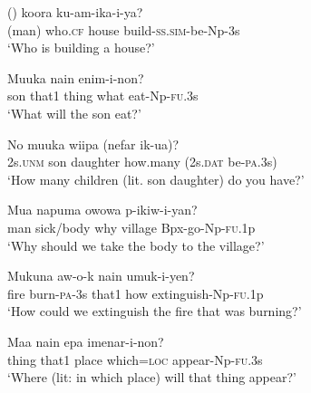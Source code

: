 \ea%
\label{ex:7:x1167}
\gll ()    koora  ku-am-ika-i-ya? \\
  (man)  who.\textsc{cf}  house  build-\textsc{ss}.\textsc{sim}-be-Np-3s    \\
\glt `Who is building a house?'
\z





\ea%
\label{ex:7:x1166}
\gll Muuka  nain      enim-i-non? \\
son  that1  thing  what  eat-Np-\textsc{fu}.3s  \\
\glt `What will the son eat?'
\z





\ea%
\label{ex:7:x1164}
\gll No  muuka  wiipa    (nefar  ik-ua)? \\
2s.\textsc{unm}  son  daughter  how.many  (2s.\textsc{dat}  be-\textsc{pa}.3s)\\
\glt `How many children (lit. son daughter) do you have?'
\z





\ea%
\label{ex:7:x1165}
\gll Mua  napuma    owowa  p-ikiw-i-yan? \\
man  sick/body  why  village  Bpx-go-Np-\textsc{fu}.1p  \\
\glt `Why should we take the body to the village?'
\z





\ea%
\label{ex:7:x1378}
\gll Mukuna  aw-o-k  nain    umuk-i-yen? \\
fire  burn-\textsc{pa}-3s  that1  how  extinguish-Np-\textsc{fu}.1p      \\
\glt `How could we extinguish the fire that was burning?'
\z





\ea%
\label{ex:7:x1173}
\gll Maa  nain  epa    imenar-i-non? \\
thing  that1  place  which=\textsc{loc}  appear-Np-\textsc{fu}.3s      \\
\glt `Where (lit: in which place) will that thing appear?'
\z





